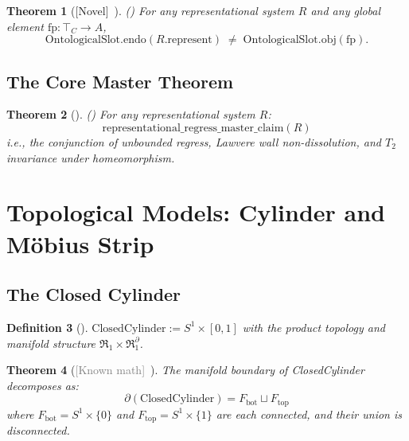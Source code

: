 \documentclass[11pt]{article}
\newtheorem{theorem}{Theorem}[section]
\newtheorem{definition}[theorem]{Definition}
\newcommand{\novel}{\textcolor{blue!70!black}{[Novel]}}
\newcommand{\known}{\textcolor{gray}{[Known math]}}
\begin{document}
\begin{theorem}[\novel\ ]
\label{thm:wall}
() For any representational system $R$ and any global element $\mathrm{fp} : \top_C \to A$,
\[
  \mathrm{OntologicalSlot.endo}(R.\mathrm{represent}) \;\neq\; \mathrm{OntologicalSlot.obj}(\mathrm{fp}).
\]
\end{theorem}

\subsection{The Core Master Theorem}

\begin{theorem}[]
\label{thm:master}
() For any representational system $R$:
\[
  \mathrm{representational\_regress\_master\_claim}(R)
\]
i.e., the conjunction of unbounded regress, Lawvere wall non-dissolution, and $T_2$ invariance under homeomorphism.
\end{theorem}

\section{Topological Models: Cylinder and M\"obius Strip}
\label{sec:models}

\subsection{The Closed Cylinder}
\label{sec:cylinder}

\begin{definition}[]
$\mathrm{ClosedCylinder} := S^1 \times [0,1]$ with the product topology and manifold structure $\mathfrak{R}_1 \times \mathfrak{R}_1^\partial$.
\end{definition}

\begin{theorem}[\known\ ]
\label{thm:cyl-boundary}
The manifold boundary of \emph{ClosedCylinder} decomposes as:
\[
  \partial(\mathrm{ClosedCylinder}) = F_{\mathrm{bot}} \sqcup F_{\mathrm{top}}
\]
where $F_{\mathrm{bot}} = S^1 \times \{0\}$ and $F_{\mathrm{top}} = S^1 \times \{1\}$ are each connected, and their union is \emph{disconnected}.
\end{theorem}
\end{document}
